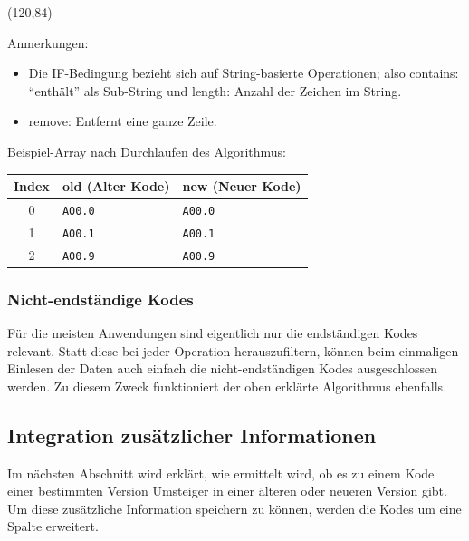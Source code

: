 \begin{centernss}
\small
\begin{struktogramm}(120,84)
    \change
    \ifend
    \whileend
\end{struktogramm}
\end{centernss}

Anmerkungen:

\begin{itemize}
\item Die IF-Bedingung bezieht sich auf String-basierte Operationen; also contains: "`enthält"' als Sub-String und length: Anzahl der Zeichen im String.
\item remove: Entfernt eine ganze Zeile. 
\end{itemize}

Beispiel-Array nach Durchlaufen des Algorithmus:

\begingroup
\renewcommand{\arraystretch}{1.2}
\setlength{\tabcolsep}{12pt}
\begin{tabular}{cll}
Index & old (Alter Kode) & new (Neuer Kode) \\
\hline
0 & \texttt{A00.0} & \texttt{A00.0} \\
1 & \texttt{A00.1} & \texttt{A00.1} \\
2 & \texttt{A00.9} & \texttt{A00.9} \\
\end{tabular}
\endgroup

\subsubsection{Nicht-endständige Kodes}

Für die meisten Anwendungen sind eigentlich nur die endständigen Kodes relevant. Statt diese bei jeder Operation herauszufiltern, können beim einmaligen Einlesen der Daten auch einfach die nicht-endständigen Kodes ausgeschlossen werden. Zu diesem Zweck funktioniert der oben erklärte Algorithmus ebenfalls. 

\subsection{Integration zusätzlicher Informationen}

Im nächsten Abschnitt wird erklärt, wie ermittelt wird, ob es zu einem Kode einer bestimmten Version Umsteiger in einer älteren oder neueren Version gibt. Um diese zusätzliche Information speichern zu können, werden die Kodes um eine Spalte erweitert.
